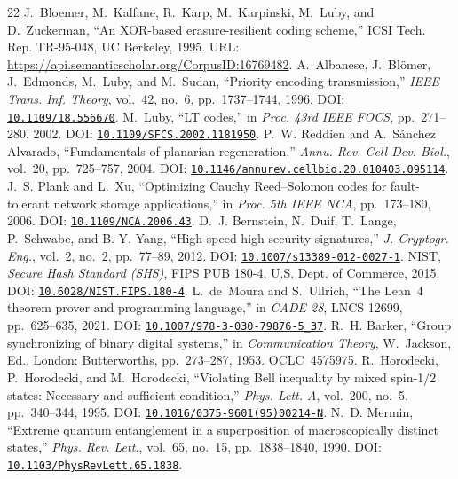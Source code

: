 \documentclass[11pt,letterpaper]{article}
\theoremstyle{remark}
\begin{document}
{\begin{thebibliography}{22}
 J.~Bloemer, M.~Kalfane, R.~Karp, M.~Karpinski, M.~Luby, and D.~Zuckerman, ``An XOR-based erasure-resilient coding scheme,'' ICSI Tech. Rep. TR-95-048, UC Berkeley, 1995. URL: \url{https://api.semanticscholar.org/CorpusID:16769482}.
 A.~Albanese, J.~Bl\"omer, J.~Edmonds, M.~Luby, and M.~Sudan, ``Priority encoding transmission,'' \emph{IEEE Trans. Inf. Theory}, vol.~42, no.~6, pp.~1737--1744, 1996. DOI: \href{https://doi.org/10.1109/18.556670}{\nolinkurl{10.1109/18.556670}}.
 M.~Luby, ``LT codes,'' in \emph{Proc. 43rd IEEE FOCS}, pp.~271--280, 2002. DOI: \href{https://doi.org/10.1109/SFCS.2002.1181950}{\nolinkurl{10.1109/SFCS.2002.1181950}}.
 P.~W. Reddien and A.~S\'anchez Alvarado, ``Fundamentals of planarian regeneration,'' \emph{Annu. Rev. Cell Dev. Biol.}, vol.~20, pp.~725--757, 2004. DOI: \href{https://doi.org/10.1146/annurev.cellbio.20.010403.095114}{\nolinkurl{10.1146/annurev.cellbio.20.010403.095114}}.
 J.~S. Plank and L.~Xu, ``Optimizing Cauchy Reed--Solomon codes for fault-tolerant network storage applications,'' in \emph{Proc. 5th IEEE NCA}, pp.~173--180, 2006. DOI: \href{https://doi.org/10.1109/NCA.2006.43}{\nolinkurl{10.1109/NCA.2006.43}}.
 D.~J. Bernstein, N.~Duif, T.~Lange, P.~Schwabe, and B.-Y. Yang, ``High-speed high-security signatures,'' \emph{J. Cryptogr. Eng.}, vol.~2, no.~2, pp.~77--89, 2012. DOI: \href{https://doi.org/10.1007/s13389-012-0027-1}{\nolinkurl{10.1007/s13389-012-0027-1}}.
 NIST, \emph{Secure Hash Standard (SHS)}, FIPS PUB 180-4, U.S. Dept. of Commerce, 2015. DOI: \href{https://doi.org/10.6028/NIST.FIPS.180-4}{\nolinkurl{10.6028/NIST.FIPS.180-4}}.
 L.~de~Moura and S.~Ullrich, ``The Lean~4 theorem prover and programming language,'' in \emph{CADE 28}, LNCS 12699, pp.~625--635, 2021. DOI: \href{https://doi.org/10.1007/978-3-030-79876-5_37}{\nolinkurl{10.1007/978-3-030-79876-5_37}}.
 R.~H. Barker, ``Group synchronizing of binary digital systems,'' in \emph{Communication Theory}, W.~Jackson, Ed., London: Butterworths, pp.~273--287, 1953. OCLC~4575975.
 R.~Horodecki, P.~Horodecki, and M.~Horodecki, ``Violating Bell inequality by mixed spin-1/2 states: Necessary and sufficient condition,'' \emph{Phys. Lett. A}, vol.~200, no.~5, pp.~340--344, 1995. DOI: \href{https://doi.org/10.1016/0375-9601(95)00214-N}{\nolinkurl{10.1016/0375-9601(95)00214-N}}.
 N.~D. Mermin, ``Extreme quantum entanglement in a superposition of macroscopically distinct states,'' \emph{Phys. Rev. Lett.}, vol.~65, no.~15, pp.~1838--1840, 1990. DOI: \href{https://doi.org/10.1103/PhysRevLett.65.1838}{\nolinkurl{10.1103/PhysRevLett.65.1838}}.

\end{thebibliography}}
\end{document}

